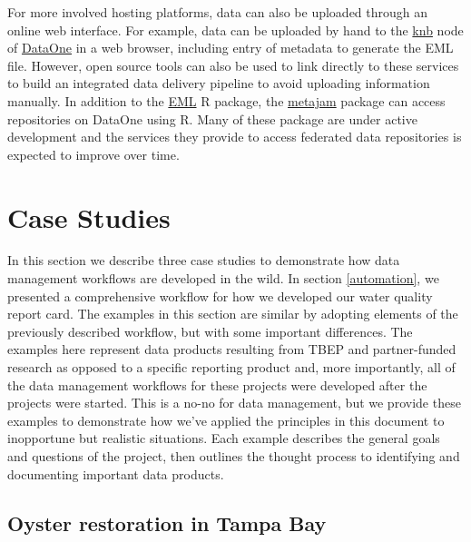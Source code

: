\documentclass[
]{book}
\begin{document}
For more involved hosting platforms, data can also be uploaded through an online web interface. For example, data can be uploaded by hand to the \href{https://knb.ecoinformatics.org/}{knb} node of \href{https://www.dataone.org/}{DataOne} in a web browser, including entry of metadata to generate the EML file. However, open source tools can also be used to link directly to these services to build an integrated data delivery pipeline to avoid uploading information manually. In addition to the \href{https://docs.ropensci.org/EML/}{EML} R package, the \href{https://nceas.github.io/metajam/}{metajam} package can access repositories on DataOne using R. Many of these package are under active development and the services they provide to access federated data repositories is expected to improve over time.

\hypertarget{cases}{%
\chapter{Case Studies}\label{cases}}

In this section we describe three case studies to demonstrate how data management workflows are developed in the wild. In section \ref{automation}, we presented a comprehensive workflow for how we developed our water quality report card. The examples in this section are similar by adopting elements of the previously described workflow, but with some important differences. The examples here represent data products resulting from TBEP and partner-funded research as opposed to a specific reporting product and, more importantly, all of the data management workflows for these projects were developed after the projects were started. This is a no-no for data management, but we provide these examples to demonstrate how we've applied the principles in this document to inopportune but realistic situations. Each example describes the general goals and questions of the project, then outlines the thought process to identifying and documenting important data products.

\hypertarget{oyster}{%
\section{Oyster restoration in Tampa Bay}\label{oyster}}
\end{document}
